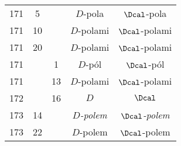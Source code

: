 \documentclass[a4paper,11pt]{article}
\numberwithin{equation}{section}
\begin{document}
\begin{center}
\begin{tabular}{|c|c|c|c|c|}
    171 & \hphantom{0}5 & & $D$-pola & $\Dcal$-pola \\
    171 & 10 & & $D$-polami & $\Dcal$-polami \\
    171 & 20 & & $D$-polami & $\Dcal$-polami \\
    171 & & \hphantom{0}1 & $D$-pól & $\Dcal$-pól \\
    171 & & 13 & $D$-polami & $\Dcal$-polami \\
    172 & & 16 & $D$ & $\Dcal$ \\
    173 & 14 & & \textit{$D$-polem} & \textit{$\Dcal$-polem} \\
    173 & 22 & & $D$-polem & $\Dcal$-polem \\
    \hline
  \end{tabular}






\end{center}
\end{document}
